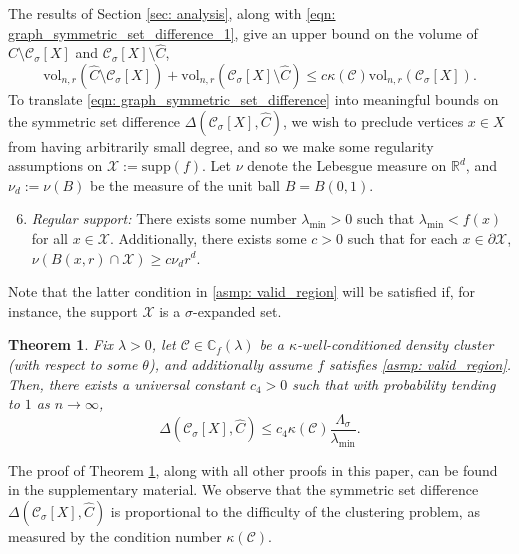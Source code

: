 \documentclass{article}
\newcommand{\vol}{\mathrm{vol}}
\newcommand{\Reals}{\mathbb{R}}
\newcommand{\Rd}{\Reals^d}
\newcommand{\1}{\mathbf{1}}
\newcommand{\Xbf}{X}             %
\newcommand{\Cbb}{\mathbb{C}}
\newcommand{\Cset}{\mathcal{C}}
\newcommand{\Csig}{\Cset_{\sigma}}
\newcommand{\Cest}{\widehat{C}}
\theoremstyle{aldenthm}
\newtheorem{theorem}{Theorem}
\theoremstyle{aldenrmrk}
\begin{document}
The results of Section \ref{sec: analysis}, along with \eqref{eqn: graph_symmetric_set_difference_1}, give an upper bound on the volume of $\Cest \setminus \Csig[\Xbf]$ and $\Csig[\Xbf] \setminus \Cest$,
\begin{equation}
\label{eqn: graph_symmetric_set_difference}
\vol_{n,r}(\Cest \setminus \Csig[\Xbf]) + \vol_{n,r}(\Csig[\Xbf] \setminus \Cest) \leq c \kappa(\Cset) \vol_{n,r}(\Csig[\Xbf]).
\end{equation}
To translate \eqref{eqn: graph_symmetric_set_difference} into meaningful bounds on the symmetric set difference $\Delta(\Csig[\Xbf], \Cest)$, we wish to preclude vertices $x \in \Xbf$ from having arbitrarily small degree, and so we make some regularity assumptions on $\mathcal{X} := \mathrm{supp}(f)$. Let $\nu$ denote the Lebesgue measure on $\Rd$, and $\nu_d := \nu(B)$ be the measure of the unit ball $B = B(0,1)$.
\begin{enumerate}[label=(A\arabic*)]
	\setcounter{enumi}{5}
	\item 
	\label{asmp: valid_region}
	\emph{Regular support:} There exists some number $\lambda_{\min} > 0$ such that $\lambda_{\min} < f(x)$ for all $x \in \mathcal{X}$. Additionally, there exists some $c > 0$ such that for each $x \in \partial \mathcal{X}$, $\nu(B(x,r) \cap \mathcal{X}) \geq c \nu_d r^d$.
\end{enumerate}
Note that the latter condition in \ref{asmp: valid_region} will be satisfied if, for instance, the support $\mathcal{X}$ is a $\sigma$-expanded set.

\begin{theorem}
	\label{thm: misclassification_rate}
	Fix $\lambda > 0$, let $\Cset \in \Cbb_f(\lambda)$ be a $\kappa$-well-conditioned density cluster (with respect to some $\theta$), and additionally assume $f$ satisfies \ref{asmp: valid_region}. Then, there exists a universal constant $c_4 > 0$ such that with probability tending to $1$ as $n \to \infty$, 
	\begin{equation}
	\label{eqn: misclassification_rate_ub}
	\Delta(\Csig[\Xbf], \Cest) \leq c_4 \kappa(\Cset) \frac{\Lambda_{\sigma}}{\lambda_{\min}}.
	\end{equation}
\end{theorem}

The proof of Theorem \ref{thm: misclassification_rate}, along with all other proofs in this paper, can be found in the supplementary material. We observe that the symmetric set difference $\Delta(\Csig[\Xbf], \Cest)$  is proportional to the difficulty of the clustering problem, as measured by the condition number $\kappa(\Cset)$.
\end{document}
